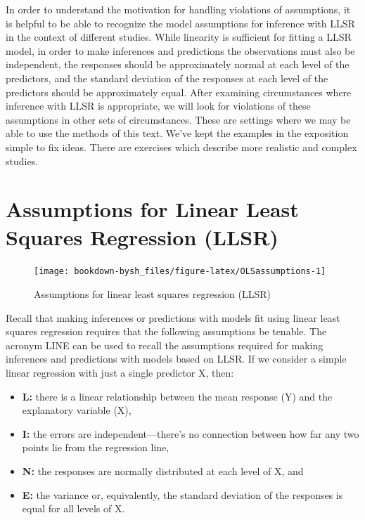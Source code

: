 \documentclass[
]{krantz}
\providecommand{\tightlist}{%
  \setlength{\itemsep}{0pt}\setlength{\parskip}{0pt}}
\begin{document}
In order to understand the motivation for handling violations of assumptions, it is helpful to be able to recognize the model assumptions for inference with LLSR in the context of different studies. While linearity is sufficient for fitting a LLSR model, in order to make inferences and predictions the observations must also be independent, the responses should be approximately normal at each level of the predictors, and the standard deviation of the responses at each level of the predictors should be approximately equal. After examining circumstances where inference with LLSR is appropriate, we will look for violations of these assumptions in other sets of circumstances. These are settings where we may be able to use the methods of this text. We've kept the examples in the exposition simple to fix ideas. There are exercises which describe more realistic and complex studies.

\hypertarget{assumptions-for-linear-least-squares-regression-llsr}{%
\section{Assumptions for Linear Least Squares Regression (LLSR)}\label{assumptions-for-linear-least-squares-regression-llsr}}

\begin{figure}

{\centering \texttt{[image: bookdown-bysh\_files/figure-latex/OLSassumptions-1]} 

}

\caption{Assumptions for linear least squares regression (LLSR)}\label{fig:OLSassumptions}
\end{figure}

Recall that making inferences or predictions with models fit using linear least squares regression  requires that the following assumptions be tenable. The acronym LINE can be used to recall the assumptions required for making inferences and predictions with models based on LLSR. If we consider a simple linear regression  with just a single predictor X, then:

\begin{itemize}
\tightlist
\item
  \textbf{L:} there is a linear relationship between the mean response (Y) and the explanatory variable (X),
\item
  \textbf{I:} the errors are independent---there's no connection between how far any two points lie from the regression line,
\item
  \textbf{N:} the responses are normally distributed at each level of X, and
\item
  \textbf{E:} the variance or, equivalently, the standard deviation of the responses is equal for all levels of X.
\end{itemize}
\end{document}
